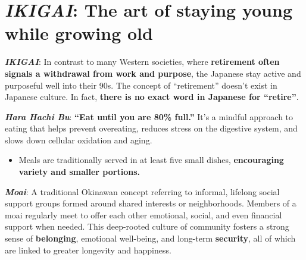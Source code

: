 \section*{\textit{IKIGAI}: The art of staying young while growing old}

\textbf{\textit{IKIGAI}}: In contrast to many Western societies, where \textbf{retirement often signals a withdrawal from work and purpose}, the Japanese stay active and purposeful well into their 90s. The concept of “retirement” doesn't exist in Japanese culture. In fact, \textbf{there is no exact word in Japanese for “retire”}. 

\textbf{\textit{Hara Hachi Bu}}: \textbf{“Eat until you are 80\% full.”} It’s a mindful approach to eating that helps prevent overeating, reduces stress on the digestive system, and slows down cellular oxidation and aging. 
\begin{itemize}
    \item Meals are traditionally served in at least five small dishes, \textbf{encouraging variety and smaller portions.}
\end{itemize}

\textbf{\textit{Moai}}: A traditional Okinawan concept referring to informal, lifelong social support groups formed around shared interests or neighborhoods. Members of a moai regularly meet to offer each other emotional, social, and even financial support when needed. This deep-rooted culture of community fosters a strong sense of \textbf{belonging}, emotional well-being, and long-term \textbf{security}, all of which are linked to greater longevity and happiness.
